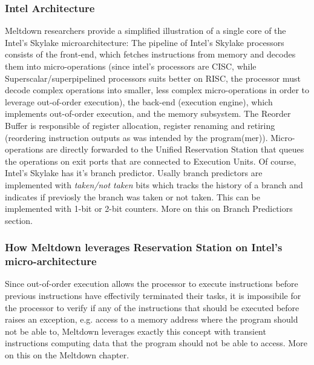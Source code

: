 \subsubsection{Intel Architecture}
Meltdown researchers provide a simplified illustration of a single core of the Intel's Skylake microarchitecture:
The pipeline of Intel's Skylake processors consists of the front-end, which fetches instructions from memory and decodes them into micro-operations
(since intel's processors are CISC, while Superscalar/superpipelined processors suits better on RISC, the processor must decode complex operations
into smaller, less complex micro-operations in order to leverage out-of-order execution), the back-end (execution engine), which implements
out-of-order execution, and the memory subsystem.
The Reorder Buffer is responsible of register allocation, register renaming and retiring (reordering instruction outputs
as was intended by the program(mer)).
Micro-operations are directly forwarded to the Unified Reservation Station that queues the operations on exit ports that are connected to Execution Units.
Of course, Intel's Skylake has it's branch predictor. Usally branch predictors are implemented with \textit{taken/not taken} bits which tracks the history
of a branch and indicates if previosly the branch was taken or not taken. This can be implemented with 1-bit or 2-bit counters. More on this on Branch Predictiors section.

\subsubsection{How Meltdown leverages Reservation Station on Intel's micro-architecture}
Since out-of-order execution allows the processor to execute instructions before previous instructions have effectivily terminated their tasks, it is impossibile
for the processor to verify if any of the instructions that should be executed before raises an exception, e.g. access to a memory address where the program
should not be able to, Meltdown leverages exactly this concept with transient instructions computing data that the program should not be able to access. More on this
on the Meltdown chapter.
